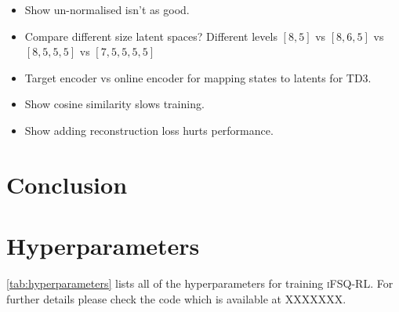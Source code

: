\documentclass{article}
\theoremstyle{plain}
\theoremstyle{definition}
\theoremstyle{remark}
\newcommand{\our}{\textsc{iFSQ-RL}\xspace}
\begin{document}



\begin{itemize}
  \item Show un-normalised isn't as good.
  \item Compare different size latent spaces? Different levels $[8,5]$ vs $[8,6,5]$ vs $[8,5,5,5]$ vs $[7,5,5,5,5]$
  \item Target encoder vs online encoder for mapping states to latents for TD3.
  \item Show cosine similarity slows training.
  \item Show adding reconstruction loss hurts performance.
\end{itemize}







\section{Conclusion}
\label{conclusion}






\newpage
\appendix
\onecolumn

\section{Hyperparameters}
\cref{tab:hyperparameters} lists all of the hyperparameters for training \our.
For further details please check the code which is available at XXXXXXX.
\end{document}
